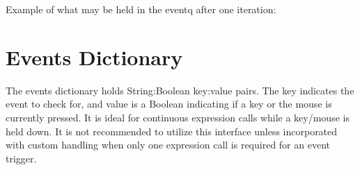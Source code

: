 \documentclass[letterpaper,10pt,english,openany,oneside]{sphinxmanual}
\begin{document}
\sphinxAtStartPar
Example of what may be held in the eventq after one iteration:
\def\sphinxLiteralBlockLabel{\label{\detokenize{fundamentals:id15}}}
\begin{sphinxVerbatim}[commandchars=\\\{\}]
 \PYG{p}{[} \PYG{p}{]}
\end{sphinxVerbatim}


\section{Events Dictionary}
\label{\detokenize{fundamentals:events-dictionary}}
\sphinxAtStartPar
The events dictionary holds String:Boolean key:value pairs. The key indicates the event to check for, and value is a Boolean indicating if a key or the mouse is currently pressed. It is ideal for continuous expression calls while a key/mouse is held down. It is not recommended to utilize this interface unless incorporated with custom handling when only one expression call is required for an event trigger.
\def\sphinxLiteralBlockLabel{\label{\detokenize{fundamentals:id16}}}
\begin{sphinxVerbatim}[commandchars=\\\{\}]
  
      \PYG{p}{[}\PYG{p}{]}
\end{sphinxVerbatim}
\end{document}
